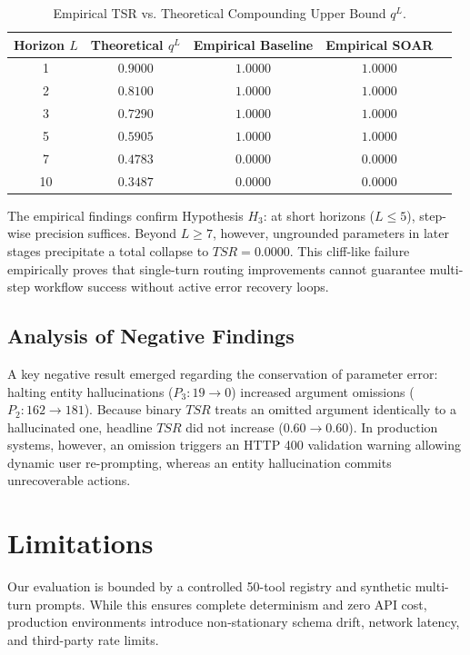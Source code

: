 \documentclass[10pt,journal,compsoc]{IEEEtran}
\begin{document}
\begin{table}[htbp]
\caption{Empirical TSR vs. Theoretical Compounding Upper Bound $q^L$.}
\label{tab:compounding}
\centering
\begin{tabular}{ccccc}
\toprule
\textbf{Horizon $L$} & \textbf{Theoretical $q^L$} & \textbf{Empirical Baseline} & \textbf{Empirical SOAR} \\
\midrule
1  & $0.9000$ & $1.0000$ & $1.0000$ \\
2  & $0.8100$ & $1.0000$ & $1.0000$ \\
3  & $0.7290$ & $1.0000$ & $1.0000$ \\
5  & $0.5905$ & $1.0000$ & $1.0000$ \\
7  & $0.4783$ & $0.0000$ & $0.0000$ \\
10 & $0.3487$ & $0.0000$ & $0.0000$ \\
\bottomrule
\end{tabular}
\end{table}

The empirical findings confirm Hypothesis $H_3$: at short horizons ($L \le 5$), step-wise precision suffices. Beyond $L \ge 7$, however, ungrounded parameters in later stages precipitate a total collapse to $TSR = 0.0000$. This cliff-like failure empirically proves that single-turn routing improvements cannot guarantee multi-step workflow success without active error recovery loops.

\subsection{Analysis of Negative Findings}
A key negative result emerged regarding the conservation of parameter error: halting entity hallucinations ($P_3: 19 \to 0$) increased argument omissions ($P_2: 162 \to 181$). Because binary $TSR$ treats an omitted argument identically to a hallucinated one, headline $TSR$ did not increase ($0.60 \to 0.60$). In production systems, however, an omission triggers an HTTP 400 validation warning allowing dynamic user re-prompting, whereas an entity hallucination commits unrecoverable actions.

\section{Limitations}
Our evaluation is bounded by a controlled 50-tool registry and synthetic multi-turn prompts. While this ensures complete determinism and zero API cost, production environments introduce non-stationary schema drift, network latency, and third-party rate limits.
\end{document}
